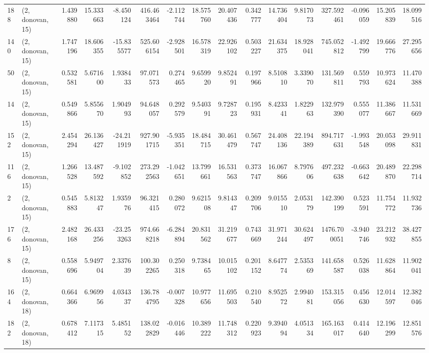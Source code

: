\begin{tabular}{llrrrrrrrrrrrrrr}
188 &  (2, donovan, 15) &   1.439880 &  15.333663 &  -8.450124 &   416.463464 &  -2.112744 &  18.575760 &  20.407436 &  0.342777 &  14.736404 &   9.817073 &   327.592461 & -0.096059 &  15.205839 &  18.099516 \\
140 &  (2, donovan, 15) &   1.747196 &  18.606355 & -15.835577 &   525.606154 &  -2.928501 &  16.578319 &  22.926102 &  0.503227 &  21.634375 &  18.928041 &   745.052812 & -1.492799 &  19.666776 &  27.295656 \\
50  &  (2, donovan, 15) &   0.532581 &   5.671600 &   1.938433 &    97.071573 &   0.274465 &   9.659920 &   9.852491 &  0.197966 &   8.510810 &   3.339070 &   131.569811 &  0.559793 &  10.973624 &  11.470388 \\
14  &  (2, donovan, 15) &   0.549866 &   5.855670 &   1.904993 &    94.648057 &   0.292579 &   9.540391 &   9.728723 &  0.195931 &   8.423341 &   1.822963 &   132.979390 &  0.555077 &  11.386667 &  11.531669 \\
152 &  (2, donovan, 15) &   2.454294 &  26.136427 & -24.211919 &   927.901715 &  -5.935351 &  18.484715 &  30.461479 &  0.567747 &  24.408136 &  22.194389 &   894.717631 & -1.993548 &  20.053098 &  29.911831 \\
116 &  (2, donovan, 15) &   1.266528 &  13.487592 &  -9.102852 &   273.292563 &  -1.042651 &  13.799661 &  16.531563 &  0.373747 &  16.067866 &   8.797606 &   497.232638 & -0.663642 &  20.489870 &  22.298714 \\
2   &  (2, donovan, 15) &   0.545883 &   5.813247 &   1.935976 &    96.321415 &   0.280072 &   9.621508 &   9.814347 &  0.209706 &   9.015510 &   2.053179 &   142.390199 &  0.523591 &  11.754772 &  11.932736 \\
176 &  (2, donovan, 15) &   2.482168 &  26.433256 & -23.253263 &   974.668218 &  -6.284894 &  20.831562 &  31.219677 &  0.743669 &  31.971244 &  30.624497 &  1476.700051 & -3.940746 &  23.212932 &  38.427855 \\
8   &  (2, donovan, 15) &   0.558696 &   5.949704 &   2.337639 &   100.302265 &   0.250318 &   9.738465 &  10.015102 &  0.201152 &   8.647774 &   2.535369 &   141.658587 &  0.526038 &  11.628864 &  11.902041 \\
164 &  (2, donovan, 18) &   0.664366 &   6.969956 &   4.034337 &   136.784795 &  -0.007328 &  10.977656 &  11.695503 &  0.210540 &   8.952572 &   2.994081 &   153.315056 &  0.456630 &  12.014597 &  12.382046 \\
182 &  (2, donovan, 18) &   0.678412 &   7.117315 &   5.485152 &   138.022829 &  -0.016446 &  10.389222 &  11.748312 &  0.220923 &   9.394094 &   4.051334 &   165.163017 &  0.414640 &  12.196299 &  12.851576 \\

\end{tabular}
